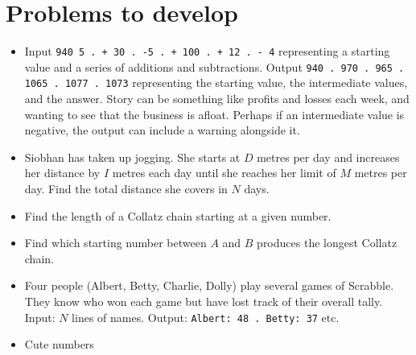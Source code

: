 \section*{Problems to develop}
\begin{itemize}
  \item Input \texttt{940 5 . + 30 . -5 . + 100 . + 12 . - 4} representing a starting
    value and a series of additions and subtractions. Output \texttt{940 . 970 . 965 .
    1065 . 1077 . 1073} representing the starting value, the intermediate values, and the
    answer. Story can be something like profits and losses each week, and wanting to see
    that the business is afloat. Perhaps if an intermediate value is negative, the output
    can include a warning alongside it.
  \item Siobhan has taken up jogging. She starts at $D$ metres per day and increases her
    distance by $I$ metres each day until she reaches her limit of $M$ metres per day.
    Find the total distance she covers in $N$ days.
  \item Find the length of a Collatz chain starting at a given number.
  \item Find which starting number between $A$ and $B$ produces the longest Collatz chain.
  \item Four people (Albert, Betty, Charlie, Dolly) play several games of Scrabble. They
    know who won each game but have lost track of their overall tally. Input: $N$ lines of
    names. Output: \texttt{Albert: 48 . Betty: 37} etc.
  \item Cute numbers
\end{itemize}
